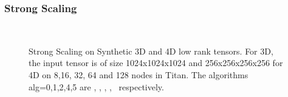\subsubsection{Strong Scaling}

\begin{figure}
\\
\caption {Strong Scaling on Synthetic 3D and 4D low rank tensors. For 3D, the input tensor is of size 1024x1024x1024 and 256x256x256x256 for 4D on 8,16, 32, 64 and 128 nodes in Titan. The algorithms alg=0,1,2,4,5 are \MU, \HALS, \BPP, \ADMM, \Nestrov\ respectively.}
\label{fig:synstrongscaling}
\end{figure}


